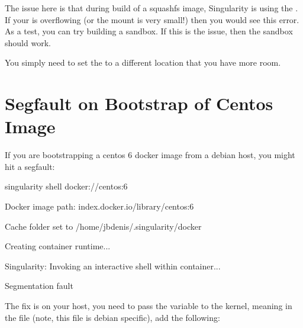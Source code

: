 \documentclass[letterpaper,10pt,english]{sphinxmanual}
\begin{document}
The issue here is that during build of a squashfs image, Singularity is
using the  . If your  is overflowing (or the mount is very small!) then
you would see this error. As a test, you can try building a sandbox. If
this is the issue, then the sandbox should work.

%
\begin{sphinxVerbatim}[commandchars=\\\{\}]
    \PYG{p}{[}\PYG{p}{]} 
\end{sphinxVerbatim}

You simply need to set the  to a different location that you have more
room.


\section{Segfault on Bootstrap of Centos Image}
\label{\detokenize{troubleshooting:segfault-on-bootstrap-of-centos-image}}
If you are bootstrapping a centos 6 docker image from a debian host,
you might hit a segfault:

%
\begin{sphinxVerbatim}[commandchars=\\\{\}]
\PYGZdl{} singularity shell docker://centos:6

Docker image path: index.docker.io/library/centos:6

Cache folder set to /home/jbdenis/.singularity/docker

Creating container runtime...

Singularity: Invoking an interactive shell within container...


Segmentation fault
\end{sphinxVerbatim}

The fix is on your host, you need to pass the variable  to the kernel,
meaning in the file  (note, this file is debian specific), add the
following:

%
\begin{sphinxVerbatim}[commandchars=\\\{\}]
\end{sphinxVerbatim}
\end{document}
